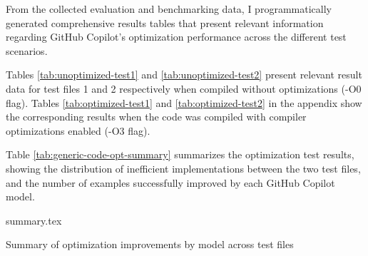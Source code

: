 From the collected evaluation and benchmarking data, I programmatically generated comprehensive results tables that present relevant information regarding GitHub Copilot's optimization performance across the different test scenarios.

Tables \ref{tab:unoptimized-test1} and \ref{tab:unoptimized-test2} present relevant result data for test files 1 and 2 respectively when compiled without optimizations (-O0 flag). 
Tables \ref{tab:optimized-test1} and \ref{tab:optimized-test2} in the appendix show the corresponding results when the code was compiled with compiler optimizations enabled (-O3 flag).

Table \ref{tab:generic-code-opt-summary} summarizes the optimization test results, showing the distribution of inefficient implementations between the two test files, and the number of examples successfully improved by each GitHub Copilot model.

\begin{table}[h]
  \centering
  {summary.tex}
  \caption{Summary of optimization improvements by model across test files}
  \label{tab:generic-code-opt-summary}
\end{table}

